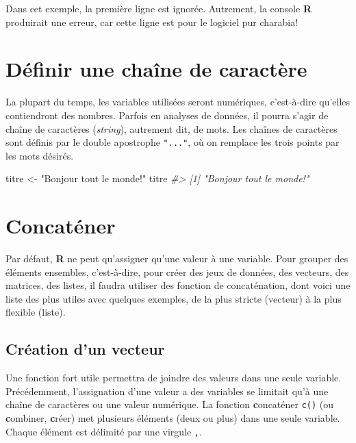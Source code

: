 \documentclass[
]{book}
\newenvironment{Shaded}{}{}
\newcommand{\CommentTok}[1]{\textit{#1}}
\newcommand{\NormalTok}[1]{#1}
\newcommand{\OtherTok}[1]{#1}
\newcommand{\StringTok}[1]{#1}
\begin{document}
Dans cet exemple, la première ligne est ignorée. Autrement, la console \textbf{R} produirait une erreur, car cette ligne est pour le logiciel pur charabia!

\hypertarget{duxe9finir-une-chauxeene-de-caractuxe8re}{%
\section{Définir une chaîne de caractère}\label{duxe9finir-une-chauxeene-de-caractuxe8re}}

La plupart du temps, les variables utilisées seront numériques, c'est-à-dire qu'elles contiendront des nombres. Parfois en analyses de données, il pourra s'agir de chaîne de caractères (\emph{string}), autrement dit, de mots. Les chaînes de caractères sont définis par le double apostrophe \texttt{"..."}, où on remplace les trois points par les mots désirés.

\begin{Shaded}
\begin{Highlighting}[]
\NormalTok{titre }\OtherTok{\textless{}{-}} \StringTok{"Bonjour tout le monde!"}
\NormalTok{titre}
\CommentTok{\#\textgreater{} [1] "Bonjour tout le monde!"}
\end{Highlighting}
\end{Shaded}

\hypertarget{concatuxe9ner}{%
\section{Concaténer}\label{concatuxe9ner}}

Par défaut, \textbf{R} ne peut qu'assigner qu'une valeur à une variable. Pour grouper des éléments ensembles, c'est-à-dire, pour créer des jeux de données, des vecteurs, des matrices, des listes, il faudra utiliser des fonction de concaténation, dont voici une liste des plus utiles avec quelques exemples, de la plus stricte (vecteur) à la plus flexible (liste).

\hypertarget{cruxe9ation-dun-vecteur}{%
\subsection{Création d'un vecteur}\label{cruxe9ation-dun-vecteur}}

Une fonction fort utile permettra de joindre des valeurs dans une seule variable. Précédemment, l'assignation d'une valeur a des variables se limitait qu'à une chaîne de caractères ou une valeur numérique. La fonction \textbf{c}oncaténer \texttt{c()} (ou \textbf{c}ombiner, \textbf{c}réer) met plusieurs éléments (deux ou plus) dans une seule variable. Chaque élément est délimité par une virgule \texttt{,}.
\end{document}
